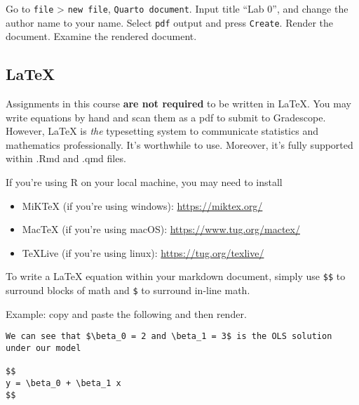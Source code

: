 \documentclass[
  letterpaper,
  DIV=11,
  numbers=noendperiod]{scrartcl}
\providecommand{\tightlist}{%
  \setlength{\itemsep}{0pt}\setlength{\parskip}{0pt}}\usepackage{longtable,booktabs,array}
\begin{document}
\begin{tcolorbox}[enhanced jigsaw, titlerule=0mm, opacityback=0, breakable, bottomtitle=1mm, bottomrule=.15mm, toptitle=1mm, colbacktitle=quarto-callout-important-color!10!white, left=2mm, arc=.35mm, coltitle=black, toprule=.15mm, colframe=quarto-callout-important-color-frame, opacitybacktitle=0.6, rightrule=.15mm, title=\textcolor{quarto-callout-important-color}{\faExclamation}\hspace{0.5em}{Important}, leftrule=.75mm, colback=white]
Go to \texttt{file} \textgreater{} \texttt{new\ file},
\texttt{Quarto\ document}. Input title ``Lab 0'', and change the author
name to your name. Select \texttt{pdf} output and press \texttt{Create}.
Render the document. Examine the rendered document.
\end{tcolorbox}

\hypertarget{latex}{%
\subsection{LaTeX}\label{latex}}

Assignments in this course \textbf{are not required} to be written in
LaTeX. You may write equations by hand and scan them as a pdf to submit
to Gradescope. However, LaTeX is \emph{the} typesetting system to
communicate statistics and mathematics professionally. It's worthwhile
to use. Moreover, it's fully supported within .Rmd and .qmd files.

If you're using R on your local machine, you may need to install

\begin{itemize}
\tightlist
\item
  MiKTeX (if you're using windows): \url{https://miktex.org/}
\item
  MacTeX (if you're using macOS): \url{https://www.tug.org/mactex/}
\item
  TeXLive (if you're using linux): \url{https://tug.org/texlive/}
\end{itemize}

To write a LaTeX equation within your markdown document, simply use
\texttt{\$\$} to surround blocks of math and \texttt{\$} to surround
in-line math.

Example: copy and paste the following and then render.

\begin{verbatim}
We can see that $\beta_0 = 2 and \beta_1 = 3$ is the OLS solution under our model

$$
y = \beta_0 + \beta_1 x
$$

\end{verbatim}
\end{document}
